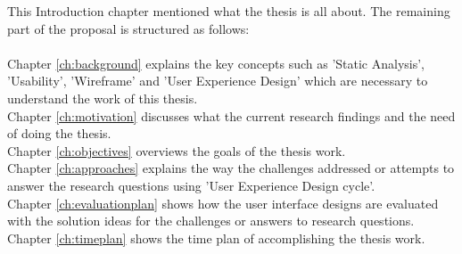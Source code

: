 This Introduction chapter mentioned what the thesis is all about. The remaining part of the proposal is structured as follows: \\ \\

\noindent Chapter \ref{ch:background} explains the key concepts such as 'Static Analysis', 'Usability', 'Wireframe' and 'User Experience Design' which are necessary to understand the work of this thesis. \\ 
Chapter \ref{ch:motivation} discusses what the current research findings and the need of doing the thesis. \\
Chapter \ref{ch:objectives} overviews the goals of the thesis work. \\
Chapter \ref{ch:approaches} explains the way the challenges addressed or attempts to answer the research questions using 'User Experience Design cycle'. \\
Chapter \ref{ch:evaluationplan} shows how the user interface designs are evaluated with the solution ideas for the challenges or answers to research questions. \\
Chapter \ref{ch:timeplan} shows the time plan of accomplishing the thesis work. \\ \\


\let\cleardoublepage\clearpage

